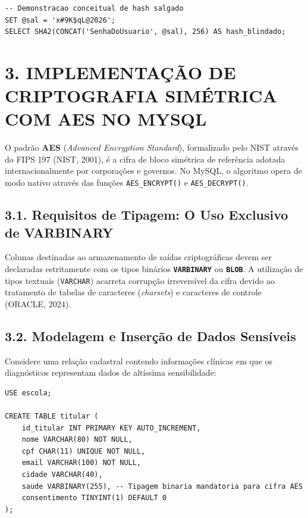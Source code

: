 \begin{lstlisting}
-- Demonstracao conceitual de hash salgado
SET @sal = 'x#9K$qL@2026';
SELECT SHA2(CONCAT('SenhaDoUsuario', @sal), 256) AS hash_blindado;
\end{lstlisting}

\newpage

\section*{3. IMPLEMENTAÇÃO DE CRIPTOGRAFIA SIMÉTRICA COM AES NO MYSQL}

O padrão \textbf{AES} (\textit{Advanced Encryption Standard}), formalizado pelo NIST através do FIPS 197 (NIST, 2001), é a cifra de bloco simétrica de referência adotada internacionalmente por corporações e governos. No MySQL, o algoritmo opera de modo nativo através das funções \texttt{AES\_ENCRYPT()} e \texttt{AES\_DECRYPT()}.

\subsection*{3.1. Requisitos de Tipagem: O Uso Exclusivo de VARBINARY}

Colunas destinadas ao armazenamento de saídas criptográficas devem ser declaradas estritamente com os tipos binários \textbf{\texttt{VARBINARY}} ou \textbf{\texttt{BLOB}}. A utilização de tipos textuais (\texttt{VARCHAR}) acarreta corrupção irreversível da cifra devido ao tratamento de tabelas de caracteres (\textit{charsets}) e caracteres de controle (ORACLE, 2024).

\subsection*{3.2. Modelagem e Inserção de Dados Sensíveis}

Considere uma relação cadastral contendo informações clínicas em que os diagnósticos representam dados de altíssima sensibilidade:

\begin{lstlisting}
USE escola;

CREATE TABLE titular (
    id_titular INT PRIMARY KEY AUTO_INCREMENT,
    nome VARCHAR(80) NOT NULL,
    cpf CHAR(11) UNIQUE NOT NULL,
    email VARCHAR(100) NOT NULL,
    cidade VARCHAR(40),
    saude VARBINARY(255), -- Tipagem binaria mandatoria para cifra AES
    consentimento TINYINT(1) DEFAULT 0
);
\end{lstlisting}

